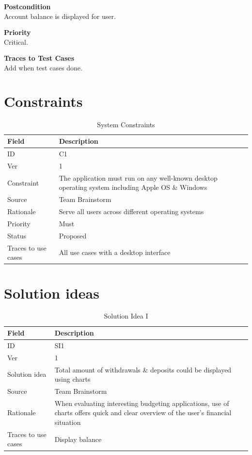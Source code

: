 \documentclass[12pt]{article}
\begin{document}
\noindent
{\bf Postcondition}\\
Account balance is displayed for user.

\noindent
{\bf Priority}\\
Critical.

\noindent
{\bf Traces to Test Cases}\\
Add when test cases done.

\section{Constraints}
\begin{table}[H]
\caption{System Constraints}
  \begin{center}
    \begin{tabular}{|l|p{10cm}|}
      \hline
      Field & Description\\
      \hline\hline
      ID & C1\\
      \hline
      Ver & 1\\
      \hline
      Constraint & The application must run on any well-known desktop operating system including Apple OS \& Windows\\
      \hline
      Source & Team Brainstorm\\
      \hline
      Rationale & Serve all users across different operating systems\\
      \hline
      Priority & Must\\
      \hline
      Status & Proposed\\
      \hline
      Traces to use cases & All use cases with a desktop interface\\
      \hline
    \end{tabular}
  \end{center}
\end{table}

\section{Solution ideas}
\begin{table}[H]
\caption{Solution Idea I}
  \begin{center}
    \begin{tabular}{|l|p{10cm}|}
      \hline
      Field & Description\\
      \hline\hline
      ID & SI1\\
      \hline
      Ver & 1\\
      \hline
      Solution idea & Total amount of withdrawals \& deposits could be displayed using charts\\
      \hline
      Source & Team Brainstorm\\
      \hline
      Rationale & When evaluating interesting budgeting applications, use of charts offers quick and clear overview of the user's financial situation\\
      \hline
      Traces to use cases & Display balance\\
      \hline
    \end{tabular}
  \end{center}
\end{table}
\end{document}
